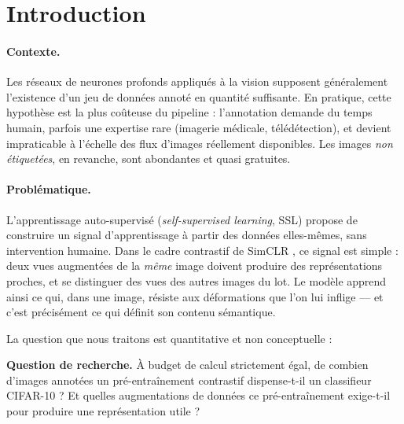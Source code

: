 \documentclass[11pt,a4paper]{article}
\newcommand{\encadre}[1]{%
  \par\vspace{4pt}\noindent
  \colorbox{fondgris}{\parbox{\dimexpr\textwidth-2\fboxsep}{\small #1}}%
  \par\vspace{4pt}}
\begin{document}
\section{Introduction}

\paragraph{Contexte.} Les réseaux de neurones profonds appliqués à la vision supposent
généralement l'existence d'un jeu de données annoté en quantité suffisante. En pratique,
cette hypothèse est la plus coûteuse du pipeline : l'annotation demande du temps humain,
parfois une expertise rare (imagerie médicale, télédétection), et devient impraticable à
l'échelle des flux d'images réellement disponibles. Les images \emph{non étiquetées}, en
revanche, sont abondantes et quasi gratuites.

\paragraph{Problématique.} L'apprentissage auto-supervisé (\emph{self-supervised
learning}, SSL) propose de construire un signal d'apprentissage à partir des données
elles-mêmes, sans intervention humaine. Dans le cadre contrastif de SimCLR
\cite{chen2020simclr}, ce signal est simple : deux vues augmentées de la \emph{même} image
doivent produire des représentations proches, et se distinguer des vues des autres images
du lot. Le modèle apprend ainsi ce qui, dans une image, résiste aux déformations que l'on
lui inflige --- et c'est précisément ce qui définit son contenu sémantique.

La question que nous traitons est quantitative et non conceptuelle :

\encadre{\textbf{Question de recherche.} À budget de calcul strictement égal, de combien
d'images annotées un pré-entraînement contrastif dispense-t-il un classifieur CIFAR-10 ?
Et quelles augmentations de données ce pré-entraînement exige-t-il pour produire une
représentation utile ?}
\end{document}
